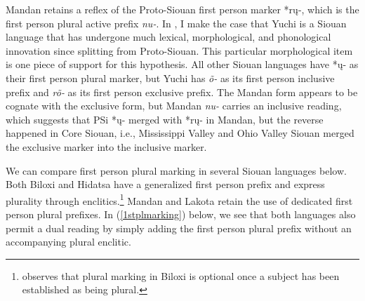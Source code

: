 Mandan retains a reflex of the Proto-Siouan first person marker *rų-, which is the first person plural active prefix \textit{nu-}. In \citet{kasak2015,kasak2016}, I make the case that Yuchi is a Siouan language that has undergone much lexical, morphological, and phonological innovation since splitting from Proto-Siouan. This particular morphological item is one piece of support for this hypothesis. All other Siouan languages have *ų- as their first person plural marker, but Yuchi has \textit{õ-} as its first person inclusive prefix and \textit{rõ-} as its first person exclusive prefix. The Mandan form appears to be cognate with the exclusive form, but Mandan \textit{nu-} carries an inclusive reading, which suggests that PSi *ų- merged with *rų- in Mandan, but the reverse happened in Core Siouan, i.e., Mississippi Valley and Ohio Valley Siouan merged the exclusive marker into the inclusive marker. 

We can compare first person plural marking in several Siouan languages below. Both Biloxi and Hidatsa have a generalized first person prefix and express plurality through enclitics.\footnote{\citet[46]{einaudi1976} observes that plural marking in Biloxi is optional once a subject has been established as being plural.} Mandan and Lakota retain the use of dedicated first person plural prefixes. In (\ref{1stplmarking}) below, we see that both languages also permit a dual reading by simply adding the first person plural prefix without an accompanying plural enclitic. 

